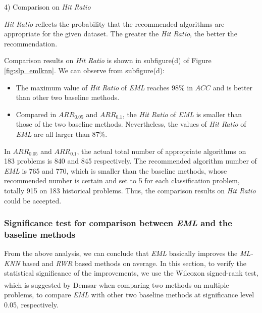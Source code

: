 \documentclass[review,3p,twocolumn,times]{elsarticle}
\newcommand{\upcite}[1]{\textsuperscript{\cite{#1}}}
\begin{document}
4) Comparison on \emph{Hit Ratio}

\emph{Hit Ratio} reflects the probability that the recommended algorithms are appropriate for the given dataset. The greater the \emph{Hit Ratio}, the better the recommendation.

Comparison results on \emph{Hit Ratio} is shown in subfigure(d) of Figure \ref{fig:slp_emlknn}. We can observe from subfigure(d):
\begin{itemize}
	\item The maximum value of \emph{Hit Ratio} of \emph{EML} reaches 98\% in $ACC$ and is better than other two baseline methods.
	
	\item Compared in $ARR_{0.05}$ and $ARR_{0.1}$, the \emph{Hit Ratio} of \emph{EML} is smaller than those of the two baseline methods. Nevertheless, the values of \emph{Hit Ratio} of \emph{EML} are all larger than 87\%.
\end{itemize}

In $ARR_{0.05}$ and $ARR_{0.1}$, the actual total number of appropriate algorithms on 183 problems is 840 and 845 respectively. The recommended algorithm number of \emph{EML} is 765 and 770, which is smaller than the baseline methods, whose recommended number is certain and set to 5 for each classification problem, totally 915 on 183 historical problems. Thus, the comparison results on \emph{Hit Ratio} could be accepted.


\subsubsection{ Significance test for comparison between \emph{EML} and the baseline methods}

From the above analysis, we can conclude that \emph{EML} basically improves the \emph{ML-KNN} based and \emph{RWR} based methods on average. In this section, to verify the statistical significance of the improvements, we use the Wilcoxon signed-rank test, which is suggested by Demsar \upcite{Demsar2006Statistical} when comparing two methods on multiple problems, to compare \emph{EML} with other two baseline methods at significance level 0.05, respectively. %
\end{document}
